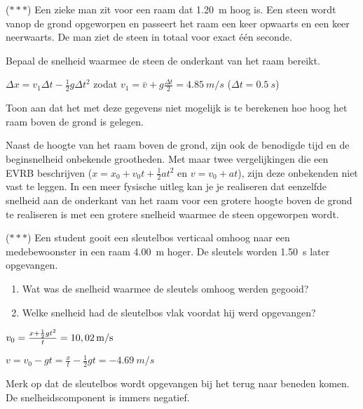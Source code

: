 \documentclass{ximera}
\begin{document}
\begin{exercise}
    ($\ast\ast\ast$) Een zieke man zit voor een raam dat \SI{1,20}{m} hoog is. Een steen wordt vanop de grond opgeworpen en passeert het raam een keer opwaarts en een keer neerwaarts. De man ziet de steen in totaal voor exact één seconde.%

    \begin{question} Bepaal de snelheid waarmee de steen de onderkant van het raam bereikt.  
        \begin{oplossing} $\Delta x= v_1\Delta t-\frac{1}{2}g\Delta t^2$ zodat $v_1=\bar{v}+g\frac{\Delta t}{2}=\SI{4,85}{m/s}$ ($\Delta t = \SI{0,5}{s}$) 
        \end{oplossing} 
    \end{question} %
    
    \begin{question} Toon aan dat het met deze gegevens niet mogelijk is te berekenen hoe hoog het raam boven de grond is gelegen. 
        \begin{oplossing} Naast de hoogte van het raam boven de grond, zijn ook de benodigde tijd en de beginsnelheid onbekende grootheden. Met maar twee vergelijkingen die een EVRB beschrijven ($x=x_0+v_0t+\frac{1}{2}at^2$ en $v=v_0+at$), zijn deze onbekenden niet vast te leggen. 
        In een meer fysische uitleg kan je je realiseren dat eenzelfde snelheid aan de onderkant van het raam voor een grotere hoogte boven de grond te realiseren is met een grotere snelheid waarmee de steen opgeworpen wordt. 
        \end{oplossing} 
    \end{question} 
\end{exercise}

\begin{exercise}
    ($\ast\ast\ast$) Een student gooit een sleutelbos verticaal omhoog naar een medebewoonster in een raam \SI{4,00}{m} hoger. De sleutels worden \SI{1,50}{s} later opgevangen.
    \begin{enumerate}
        \item Wat was de snelheid waarmee de sleutels omhoog werden gegooid?
        \item Welke snelheid had de sleutelbos vlak voordat hij werd opgevangen?
    \end{enumerate}
    \begin{oplossing}
        $v_0=\frac{x+\frac{1}{2}gt^2}{t}=10,02\rm\,m/s$ 

        $v=v_0-gt=\frac{x}{t}-\frac{1}{2}gt=\SI{-4,69}{m/s}$

        Merk op dat de sleutelbos wordt opgevangen bij het terug naar beneden komen. De snelheidscomponent is immers negatief.
    \end{oplossing}
\end{exercise}
\end{document}
